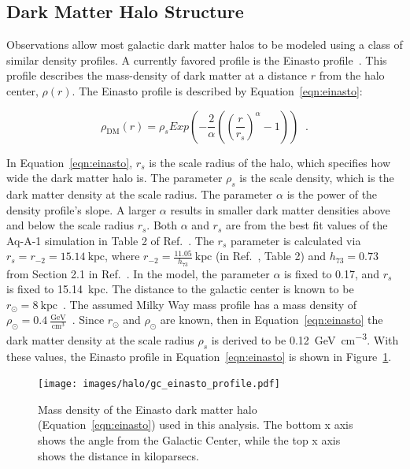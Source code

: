   \subsection{Dark Matter Halo Structure}\label{dm_spatial}
    
    Observations allow most galactic dark matter halos to be modeled using a class of similar density profiles.
    A currently favored profile is the Einasto profile~\cite{einastoprofile1,einastoprofile2}.
    This profile describes the mass-density of dark matter at a distance $r$ from the halo center, $\rho(r)$.
    The Einasto profile is described by Equation~\ref{eqn:einasto}:

    \begin{equation} \label{eqn:einasto}
      \rho_{\textrm{DM}} \left( r \right) = \rho_{s} Exp \left( - \frac{2}{\alpha} \left( {\left( \frac{r}{r_s} \right)}^{\alpha} - 1 \right) \right) \;\; .
    \end{equation}
    
    
    In Equation~\ref{eqn:einasto}, $r_s$ is the scale radius of the halo, which specifies how wide the dark matter halo is.
    The parameter $\rho_s$ is the scale density, which is the dark matter density at the scale radius.
    The parameter $\alpha$ is the power of the density profile's slope.
    A larger $\alpha$ results in smaller dark matter densities above and below the scale radius $r_s$.
    Both $\alpha$ and $r_s$ are from the best fit values of the Aq-A-1 simulation in Table 2 of Ref.~\cite{mw_halo_params}.
    The $r_s$ parameter is calculated via $r_s=r_{-2}=15.14\:\textrm{kpc}$, where $r_{-2}=\frac{11.05}{h_{73}}\:\textrm{kpc}$ (in Ref.~\cite{mw_halo_params}, Table 2) and $h_{73}=0.73$ from Section 2.1 in Ref.~\cite{mw_halo_params}.
    In the model, the parameter $\alpha$ is fixed to 0.17, and $r_s$ is fixed to \SI{15.14}{kpc}.
    The distance to the galactic center is known to be $r_\odot=8\:\textrm{kpc}$~\cite{gc_distance_1,gc_distance_2,gc_distance_3}.
    The assumed Milky Way mass profile has a mass density of $\rho_\odot = 0.4\:\frac{\textrm{GeV}}{\textrm{cm}^3}$~\cite{local_dm_density,direct_dm_astrophysical_uncertainties}.
    Since $r_\odot$ and $\rho_\odot$ are known, then in Equation~\ref{eqn:einasto} the dark matter density at the scale radius $\rho_s$ is derived to be \SI{0.12}{\GeV\per\cm^3}.
    With these values, the Einasto profile in Equation~\ref{eqn:einasto} is shown in Figure~\ref{fig:gchalo_density}.
  
    \begin{figure}[ht]
      \centering
      \texttt{[image: images/halo/gc\_einasto\_profile.pdf]}
      \caption[Galactic Center Einasto Halo Density]{
        Mass density of the Einasto dark matter halo (Equation~\ref{eqn:einasto}) used in this analysis.
        The bottom x axis shows the angle from the Galactic Center, while the top x axis shows the distance in kiloparsecs.
        \CaptionBlankLine
        }
      \label{fig:gchalo_density}
    \end{figure}

